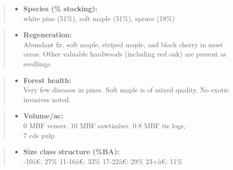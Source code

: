 \documentclass[]{tufte-handout}
\newcommand{\euro}{€}
\providecommand{\tightlist}{%
  \setlength{\itemsep}{0pt}\setlength{\parskip}{0pt}}
\begin{document}
\begin{quote}
\begin{itemize}
\tightlist
\item
  \textbf{Species (\% stocking):}\\
  \vspace{2pt} white pine (51\%), soft maple (31\%), spruce (18\%)
\end{itemize}
\end{quote}

\begin{quote}
\begin{itemize}
\tightlist
\item
  \textbf{Regeneration:}\\
  \vspace{2pt} Abundant fir, soft maple, striped maple, and black cherry
  in most areas. Other valuable hardwoods (including red oak) are
  present as seedlings.
\end{itemize}
\end{quote}

\begin{quote}
\begin{itemize}
\tightlist
\item
  \textbf{Forest health:}\\
  \vspace{2pt} Very few diseases in pines. Soft maple is of mixed
  quality. No exotic invasives noted.
\end{itemize}
\end{quote}

\begin{quote}
\begin{itemize}
\tightlist
\item
  \textbf{Volume/ac:}\\
  \vspace{2pt} 0 MBF veneer, 10 MBF sawtimber, 0.8 MBF tie logs,\\
  7 cds pulp
\end{itemize}
\end{quote}

\begin{quote}
\begin{itemize}
\tightlist
\item
  \textbf{Size class structure (\%BA):}\\
  \vspace{2pt} -10â\euro{}: 27\% \textbar{} 11-16â\euro{}:
  33\% \textbar{} 17-22â\euro{}: 29\% \textbar{} 23+â\euro{}: 11\%
\end{itemize}
\end{quote}
\end{document}
